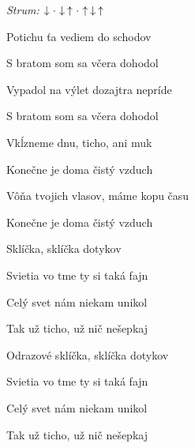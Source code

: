 \begin{song}


\begin{headerbox}
\textit{Strum:} $\Down\Miss\Down\Up\Miss\Up\Down\Up$
\end{headerbox}

\begin{hchordbox}
\end{hchordbox}

\Large

\bigskip

Potichu ťa vediem do schodov \par
{}S bratom som sa včera dohodol \par
{}Vypadol na výlet dozajtra nepríde \par
{}S bratom som sa včera dohodol \par

\bigskip

Vkĺzneme dnu, ticho, ani muk \par
{}Konečne je doma čistý vzduch \par
{}Vôňa tvojich vlasov, máme kopu času \par
{}Konečne je doma čistý vzduch \par

\bigskip

\begin{chorusbox}{\Refren}
Sklíčka, sklíčka dotykov \par
{}Svietia vo tme ty si taká fajn \par
Celý svet nám niekam unikol \par
{}Tak už ticho, už nič nešepkaj \par

\bigskip

Odrazové sklíčka, sklíčka dotykov \par
{}Svietia vo tme ty si taká fajn \par
Celý svet nám niekam unikol \par
{}Tak už ticho, už nič nešepkaj \par
\end{chorusbox}


\end{song}
